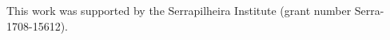 \documentclass[sigplan,protrusion=true,expansion,screen]{acmart}
\begin{document}
\maketitle







\begin{acks}
This work was supported by the Serrapilheira Institute (grant number
Serra-1708-15612).
\end{acks}

\balance



\appendix
\clearpage
\nobalance

\nobalance
\clearpage
\nobalance

\nobalance
\end{document}
